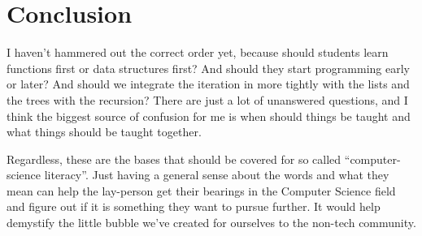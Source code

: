 \documentclass[12pt]{article}
\begin{document}
    \section{Conclusion}

      I haven't hammered out the correct order yet, because should students learn functions first or data structures first? And should they start programming early or later? And should we integrate the iteration in more tightly with the lists and the trees with the recursion? There are just a lot of unanswered questions, and I think the biggest source of confusion for me is when should things be taught and what things should be taught together. 

      Regardless, these are the bases that should be covered for so called ``computer-science literacy''. Just having a general sense about the words and what they mean can help the lay-person get their bearings in the Computer Science field and figure out if it is something they want to pursue further. It would help demystify the little bubble we've created for ourselves to the non-tech community. 
\end{document}
